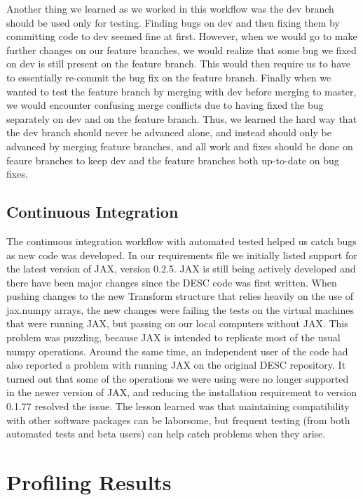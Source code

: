\documentclass{article}
\begin{document}
Another thing we learned as we worked in this workflow was the dev branch should be used only for testing.
Finding bugs on dev and then fixing them by committing code to dev seemed fine at first.
However, when we would go to make further changes on our feature branches, we would realize that some bug we fixed on dev is still present on the feature branch.
This would then require us to have to essentially re-commit the bug fix on the feature branch.
Finally when we wanted to test the feature branch by merging with dev before merging to master, we would encounter confusing merge conflicts due to having fixed the bug separately on dev and on the feature branch.
Thus, we learned the hard way that the dev branch should never be advanced alone, and instead should only be advanced by merging feature branches, and all work and fixes should be done on feaure branches to keep dev and the feature branches both up-to-date on bug fixes.

\subsection{Continuous Integration}

The continuous integration workflow with automated tested helped us catch bugs as new code was developed.
In our requirements file we initially listed support for the latest version of JAX, version 0.2.5.
JAX is still being actively developed and there have been major changes since the DESC code was first written.
When pushing changes to the new Transform structure that relies heavily on the use of jax.numpy arrays, the new changes were failing the tests on the virtual machines that were running JAX, but passing on our local computers without JAX.
This problem was puzzling, because JAX is intended to replicate most of the usual numpy operations.
Around the same time, an independent user of the code had also reported a problem with running JAX on the original DESC repository.
It turned out that some of the operations we were using were no longer supported in the newer version of JAX, and reducing the installation requirement to version 0.1.77 resolved the issue.
The lesson learned was that maintaining compatibility with other software packages can be laborsome, but frequent testing (from both automated tests and beta users) can help catch problems when they arise.

\section{Profiling Results}
\end{document}

